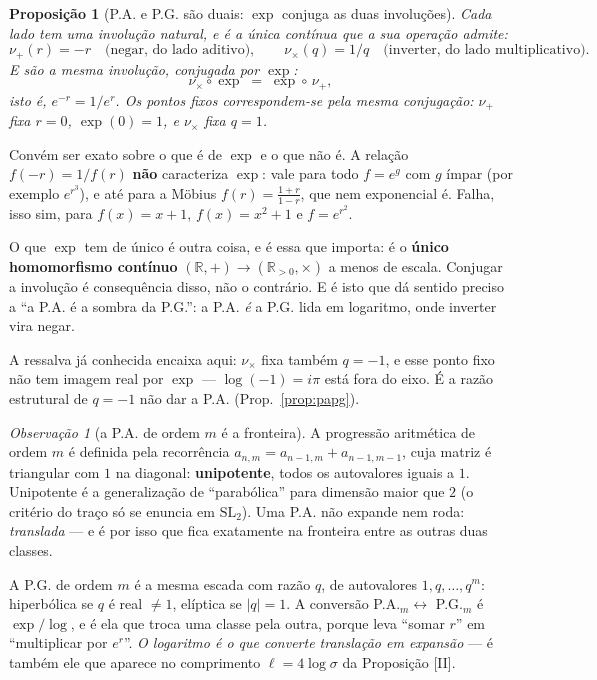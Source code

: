 \documentclass[11pt,a4paper]{article}
\theoremstyle{plain}
\newtheorem{proposicao}[teorema]{Proposição}
\theoremstyle{definition}
\theoremstyle{remark}
\newtheorem{obs}[teorema]{Observação}
\newcommand{\R}{\mathbb{R}}
\newcommand{\SL}{\mathrm{SL}}
\begin{document}
\begin{proposicao}[P.A. e P.G. são duais: $\exp$ conjuga as duas involuções]\label{prop:conjuga}
Cada lado tem uma involução natural, e é a única \emph{contínua} que a sua operação admite:
\[
  \nu_+(r) = -r \quad\text{(negar, do lado aditivo)}, \qquad
  \nu_\times(q) = 1/q \quad\text{(inverter, do lado multiplicativo)} .
\]
E são a \emph{mesma} involução, conjugada por $\exp$:
\[
  \nu_\times \circ \exp \;=\; \exp \circ\, \nu_+ ,
\]
isto é, $e^{-r} = 1/e^{r}$. Os pontos fixos correspondem-se pela mesma conjugação:
$\nu_+$ fixa $r=0$, $\exp(0)=1$, e $\nu_\times$ fixa $q=1$.
\end{proposicao}

\noindent Convém ser exato sobre o que é de $\exp$ e o que não é. A relação $f(-r) = 1/f(r)$
\textbf{não} caracteriza $\exp$: vale para todo $f = e^{g}$ com $g$ ímpar (por exemplo
$e^{r^3}$), e até para a Möbius $f(r) = \frac{1+r}{1-r}$, que nem exponencial é. Falha, isso sim,
para $f(x)=x+1$, $f(x)=x^2+1$ e $f = e^{r^2}$.

O que $\exp$ tem de único é outra coisa, e é essa que importa: é o \textbf{único homomorfismo
contínuo} $(\R,+) \to (\R_{>0},\times)$ a menos de escala. Conjugar a involução é consequência
disso, não o contrário. E é isto que dá sentido preciso a ``a P.A. é a sombra da P.G.'': a P.A.
\emph{é} a P.G. lida em logaritmo, onde inverter vira negar.

A ressalva já conhecida encaixa aqui: $\nu_\times$ fixa também $q=-1$, e esse ponto fixo não tem
imagem real por $\exp$ --- $\log(-1) = i\pi$ está fora do eixo. É a razão estrutural de $q=-1$ não
dar a P.A. (Prop.~\ref{prop:papg}).



\begin{obs}[a P.A. de ordem $m$ é a fronteira]\label{obs:pam}
A progressão aritmética de ordem $m$ é definida pela recorrência $a_{n,m} = a_{n-1,m} +
a_{n-1,m-1}$, cuja matriz é triangular com $1$ na diagonal: \textbf{unipotente}, todos os
autovalores iguais a $1$. Unipotente é a generalização de ``parabólica'' para dimensão maior que
$2$ (o critério do traço só se enuncia em $\SL_2$). Uma P.A. não expande nem roda: \emph{translada}
--- e é por isso que fica exatamente na fronteira entre as outras duas classes.

A P.G. de ordem $m$ é a mesma escada com razão $q$, de autovalores $1,q,\dots,q^m$: hiperbólica se
$q$ é real $\neq1$, elíptica se $|q|=1$. A conversão P.A.$_m \leftrightarrow$ P.G.$_m$ é
$\exp/\log$, e é ela que troca uma classe pela outra, porque leva ``somar $r$'' em ``multiplicar
por $e^r$''. \emph{O logaritmo é o que converte translação em expansão} --- é também ele que
aparece no comprimento $\ell = 4\log\sigma$ da Proposição [II].
\end{obs}
\end{document}
